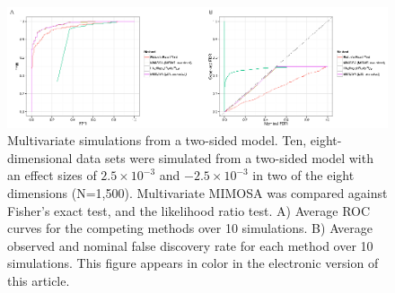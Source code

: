 \documentclass[12pt,oupdraft]{biostatistics}
\begin{document}
\begin{figure} %
   \centering
   \includegraphics{TIKZFig5.eps}
   \caption{Multivariate simulations from a two-sided model. Ten, eight-dimensional data sets were simulated from a two-sided model with an effect sizes of $2.5\times 10^{-3}$ and $-2.5\times 10^{-3}$ in two of the eight dimensions (N=1,500). Multivariate MIMOSA was compared against Fisher's exact test, and the likelihood ratio test. A) Average ROC curves for the competing methods over 10 simulations. B) Average observed and nominal false discovery rate for each method over 10 simulations. This figure appears in color in the electronic version of this article.}
   \label{fig:mvsimulations}
\end{figure}
\end{document}
